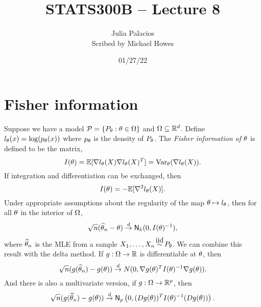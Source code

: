 




\title{STATS300B -- Lecture 8}
\author{Julia Palacios\\ Scribed by Michael Howes}
\date{01/27/22}

\pagestyle{fancy}
\fancyhf{}


\maketitle
\tableofcontents
\section{Fisher information}
Suppose we have a model ${\mathcal{P}} = \{P_{\theta} : {\theta} \in {{\Omega}}\}$ and ${{\Omega}} \subseteq {\mathbb R}^d$. Define $l_{\theta}(x) = \log(p_{\theta}(x))$ where $p_{\theta}$ is the density of $P_{\theta}$. The \emph{Fisher information of ${\theta}$} is defined to be the matrix,
\[I({\theta}) = {\mathbb{E}}[\nabla l_{\theta}(X) \nabla l_{\theta}(X)^T] = \operatorname{Var}_{\theta}(\nabla l_{\theta}(X)). \]
If integration and differentiation can be exchanged, then
\[I({\theta}) = -{\mathbb{E}}[\nabla^2 l_{\theta}(X)].\]
Under appropriate assumptions about the regularity of the map ${\theta} \mapsto l_{\theta}$, then for all ${\theta}$ in the interior of ${{\Omega}}$,
\[\sqrt{n}(\widehat{{\theta}}_n-{\theta}) \stackrel{d}{\to} \mathsf{N}_k(0,I({\theta})^{-1}), \]
where $\widehat{{\theta}}_n$ is the MLE from a sample $X_1,\ldots,X_n \iid P_\ta$. We can combine this result with the delta method. If $g:{{\Omega}} \to {\mathbb R}$ is differentiable at ${\theta}$, then 
\[\sqrt{n}(g(\widehat{{\theta}}_n)-g({\theta})) \stackrel{d}{\to} N(0, \nabla g({\theta})^T I({\theta})^{-1}\nabla g({\theta})).\]
And there is also a multivariate version, if $g: {{\Omega}} \to {\mathbb R}^p$, then 
\[\sqrt{n}(g(\widehat{{\theta}}_n)-g({\theta})) \stackrel{d}{\to} \mathsf{N}_p\left(0,(Dg({\theta}))^TI({\theta})^{-1}(Dg({\theta}))\right). \]

